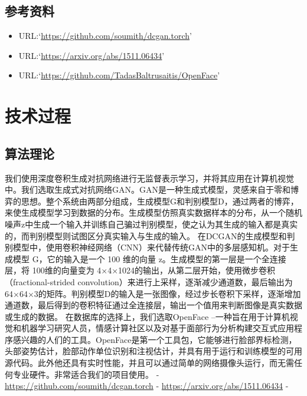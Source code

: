 \documentclass[hyperref, a4paper]{ctexart}
\providecommand{\tightlist}{%
  \setlength{\itemsep}{0pt}\setlength{\parskip}{0pt}}
\begin{document}
\hypertarget{ux53c2ux8003ux8d44ux6599}{%
\subsection{参考资料}\label{ux53c2ux8003ux8d44ux6599}}

\begin{itemize}
\tightlist
\item
  URL:`\url{https://github.com/soumith/dcgan.torch}'
\item
  URL:`\url{https://arxiv.org/abs/1511.06434}'
\item
  URL:`\url{https://github.com/TadasBaltrusaitis/OpenFace}'
\end{itemize}

\hypertarget{ux6280ux672fux8fc7ux7a0b}{%
\section{技术过程}\label{ux6280ux672fux8fc7ux7a0b}}

\hypertarget{ux7b97ux6cd5ux7406ux8bba}{%
\subsection{算法理论}\label{ux7b97ux6cd5ux7406ux8bba}}

我们使用深度卷积生成对抗网络进行无监督表示学习，并将其应用在计算机视觉中。我们选取生成式对抗网络GAN。GAN是一种生成式模型，灵感来自于零和博弈的思想。整个系统由两部分组成，生成模型G和判别模型D，通过两者的博弈，来使生成模型学习到数据的分布。生成模型仿照真实数据样本的分布，从一个随机噪声z中生成一个输入并训练自己骗过判别模型，使之认为其生成的输入都是真实的，而判别模型则试图区分真实输入与生成的输入。
在DCGAN的生成模型和判别模型中，使用卷积神经网络（CNN）来代替传统GAN中的多层感知机。对于生成模型
G，它的输入是一个 100 维的向量 z。生成模型的第一层是一个全连接层，将
100维的向量变为
4×4×1024的输出，从第二层开始，使用微步卷积（fractional-strided
convolution）来进行上采样，逐渐减少通道数，最后输出为64×64×3的矩阵。判别模型D的输入是一张图像，经过步长卷积下采样，逐渐增加通道数，最后得到的卷积特征通过全连接层，输出一个值用来判断图像是真实数据或生成的数据。
在数据库的选择上，我们选取OpenFace
--一种旨在用于计算机视觉和机器学习研究人员，情感计算社区以及对基于面部行为分析构建交互式应用程序感兴趣的人们的工具。OpenFace是第一个工具包，它能够进行脸部界标检测，头部姿势估计，脸部动作单位识别和注视估计，并具有用于运行和训练模型的可用源代码。此外他还具有实时性能，并且可以通过简单的网络摄像头运行，而无需任何专业硬件。非常适合我们的项目使用。
\newline - \url{https://github.com/soumith/dcgan.torch} -
\url{https://arxiv.org/abs/1511.06434} -
\end{document}
